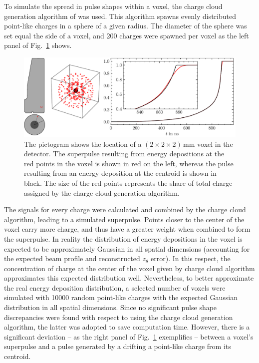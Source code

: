 To simulate the spread in pulse shapes within a voxel, the charge cloud generation algorithm of \SSD{} was used. This algorithm spawns evenly distributed point-like charges in a sphere of a given radius. The diameter of the sphere was set equal the side of a voxel, and 200 charges were spawned per voxel as the left panel of Fig.~\ref{fig:voxelation} shows.
\begin{figure}[htb]
    \centering
    \includegraphics[width=6in]{figs/sim/voxelation.pdf}
    \caption{The pictogram shows the location of a $(2\times2\times2)$\,mm voxel in the detector. The superpulse resulting from energy depositions at the red points in the voxel is shown in red on the left, whereas the pulse resulting from an energy deposition at the centroid is shown in black. The size of the red points represents the share of total charge assigned by the charge cloud generation algorithm.}
    \label{fig:voxelation}
\end{figure}

The signals for every charge were calculated and combined by the charge cloud algorithm, leading to a simulated superpulse. Points closer to the center of the voxel carry more charge, and thus have a greater weight when combined to form the superpulse. In reality the distribution of energy depositions in the voxel is expected to be approximately Gaussian in all spatial dimensions (accounting for the expected beam profile and reconstructed $z_\theta$ error). In this respect, the concentration of charge at the center of the voxel given by charge cloud algorithm approximates this expected distribution well. Nevertheless, to better approximate the real energy deposition distribution, a selected number of voxels were simulated with 10000 random point-like charges with the expected Gaussian distribution in all spatial dimensions. Since no significant pulse shape discrepancies were found with respect to using the charge cloud generation algorithm, the latter was adopted to save computation time. However, there is a significant deviation -- as the right panel of Fig.~\ref{fig:voxelation} exemplifies -- between a voxel's superpulse and a pulse generated by a drifting a point-like charge from its centroid. 

